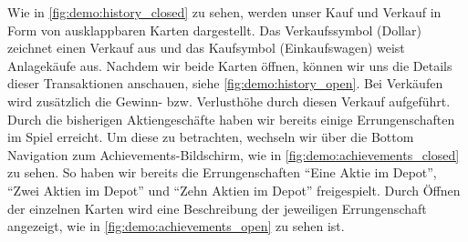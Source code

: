\documentclass[a4paper]{article}
\begin{document}
Wie in \autoref{fig:demo:history_closed} zu sehen, werden unser Kauf und Verkauf in Form von ausklappbaren Karten dargestellt. Das Verkaufssymbol (Dollar) zeichnet einen Verkauf aus und das Kaufsymbol (Einkaufswagen) weist Anlagekäufe aus. Nachdem wir beide Karten öffnen, können wir uns die Details dieser Transaktionen anschauen, siehe \autoref{fig:demo:history_open}. Bei Verkäufen wird zusätzlich die Gewinn- bzw. Verlusthöhe durch diesen Verkauf aufgeführt.\newline
Durch die bisherigen Aktiengeschäfte haben wir bereits einige Errungenschaften im Spiel erreicht. Um diese zu betrachten, wechseln wir über die Bottom Navigation zum Achievements-Bildschirm, wie in \autoref{fig:demo:achievements_closed} zu sehen. So haben wir bereits die Errungenschaften "`Eine Aktie im Depot"', "`Zwei Aktien im Depot"' und "`Zehn Aktien im Depot"' freigespielt. Durch Öffnen der einzelnen Karten wird eine Beschreibung der jeweiligen Errungenschaft angezeigt, wie in  \autoref{fig:demo:achievements_open} zu sehen ist.
\end{document}

